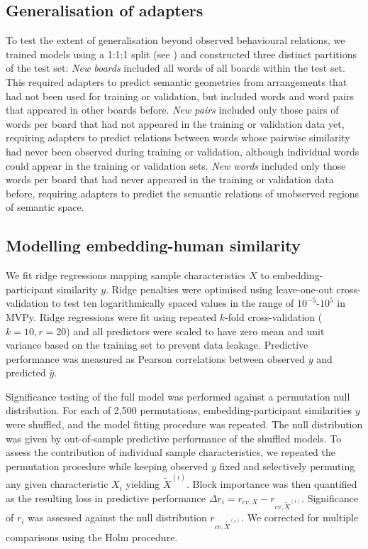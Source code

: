 \documentclass[pdflatex,sn-mathphys]{sn-jnl}
\begin{document}
\subsection{Generalisation of adapters}\label{generalisation}
To test the extent of generalisation beyond observed behavioural relations, we trained models using a 1:1:1 split (see ) and constructed three distinct partitions of the test set: \textit{New boards} included all words of all boards within the test set. This required adapters to predict semantic geometries from arrangements that had not been used for training or validation, but included words and word pairs that appeared in other boards before. \textit{New pairs} included only those pairs of words per board that had not appeared in the training or validation data yet, requiring adapters to predict relations between words whose pairwise similarity had never been observed during training or validation, although individual words could appear in the training or validation sets. \textit{New words} included only those words per board that had never appeared in the training or validation data before, requiring adapters to predict the semantic relations of unobserved regions of semantic space.

\subsection{Modelling embedding-human similarity}\label{embsub}
We fit ridge regressions mapping sample characteristics $X$ to embedding-participant similarity $y$. Ridge penalties were optimised using leave-one-out cross-validation to test ten logarithmically spaced values in the range of $10^{-5}$-$10^{5}$ in MVPy\cite{mvpy}. Ridge regressions were fit using repeated $k$-fold cross-validation ($k = 10, r = 20$) and all predictors were scaled to have zero mean and unit variance based on the training set to prevent data leakage. Predictive performance was measured as Pearson correlations between observed $y$ and predicted $\hat{y}$.

Significance testing of the full model was performed against a permutation null distribution. For each of 2,500 permutations, embedding-participant similarities $y$ were shuffled, and the model fitting procedure was repeated. The null distribution was given by out-of-sample predictive performance of the shuffled models. To assess the contribution of individual sample characteristics, we repeated the permutation procedure while keeping observed $y$ fixed and selectively permuting any given characteristic $X_i$ yielding $\tilde{X}^{(i)}$. Block importance was then quantified as the resulting loss in predictive performance $\Delta r_i = r_{cv,X} - r_{cv,\tilde{X}^{(i)}}$. Significance of $r_i$ was assessed against the null distribution $r_{cv,\tilde{X}^{(i)}}$. We corrected for multiple comparisons using the Holm procedure.
\end{document}
